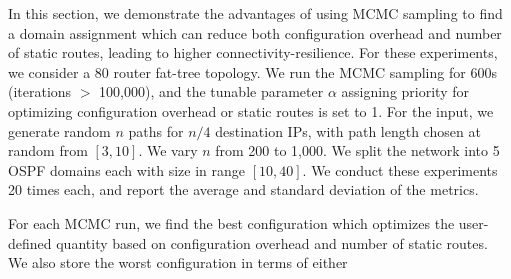 In this section, we demonstrate the advantages of using MCMC sampling
to find a domain assignment which can  
reduce both configuration overhead and number of static routes, 
leading to higher connectivity-resilience. 
For these experiments,
we consider a
80 router fat-tree topology. 
We run the MCMC sampling for 600s
(iterations $>$ 100,000), 
and the tunable parameter $\alpha$ assigning
priority for optimizing configuration 
overhead or static routes is set
to 1. For the input, we generate 
random $n$ paths for $n/4$
destination IPs, with path
 length chosen at random from $[3,10]$. 
We vary $n$ from 200 to 1,000.
We
split the network into 5 OSPF domains 
each with size in range $[10,40]$. We
conduct these experiments 20 times each, 
and report the average and
standard deviation of the metrics.

%
For each MCMC run, we find the best configuration
which optimizes the user-defined quantity based on 
configuration overhead and number of static routes. 
We also store the worst configuration in terms of either
